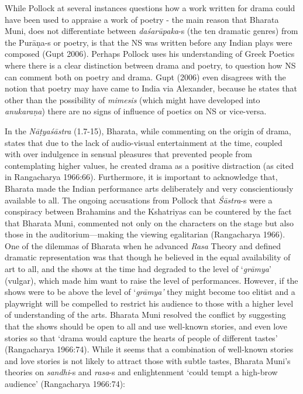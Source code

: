 While Pollock at several instances questions how a work written for drama could have been used to appraise a work of poetry - the main reason that Bharata Muni, does not differentiate between \hbox{\textsl{daśarūpaka}-s} (the ten dramatic genres) from the Purāṇa-s or poetry, is that the NS was written before any Indian plays were composed (Gupt 2006). Perhaps Pollock uses his understanding of Greek Poetics where there is a clear distinction between drama and poetry, to question how NS can comment both on poetry and drama. Gupt (2006) even disagrees with the notion that poetry may have came to India via Alexander, because he states that other than the possibility of \textsl{mimesis} (which might have developed into \textsl{anukaraṇa}) there are no signs of influence of poetics on NS or vice-versa. 


In the \textsl{Nāṭyaśāstra} (1.7-15), Bharata, while commenting on the origin of drama, states that due to the lack of audio-visual entertainment at the time, coupled with over indulgence in sensual pleasures that prevented people from contemplating higher values, he created drama as a positive distraction (as cited in Rangacharya 1966:66). Furthermore, it is important to acknowledge that, Bharata made the Indian performance arts deliberately and very conscientiously available to all. The ongoing accusations from Pollock that \textsl{Śāstra}-s were a conspiracy between Brahamins and the Kshatriyas can be countered by the fact that Bharata Muni, commented not only on the characters on the stage but also those in the auditorium---making the viewing egalitarian (Rangacharya 1966). One of the dilemmas of Bharata when he advanced \textsl{Rasa} Theory and defined dramatic representation was that though he believed in the equal availability of art to all, and the shows at the time had degraded to the level of ‘\textsl{grāmya}’ (vulgar), which made him want to raise the level of performances. However, if the shows were to be above the level of ‘\textsl{grāmya’} they might become too elitist and a playwright will be compelled to restrict his audience to those with a higher level of understanding of the arts. Bharata Muni resolved the conflict by suggesting that the shows should be open to all and use well-known stories, and even love stories so that ‘drama would capture the hearts of people of different tastes’ (Rangacharya 1966:74). While it seems that a combination of well-known stories and love stories is not likely to attract those with subtle tastes, Bharata Muni’s theories on \hbox{\textsl{sandhi}-s} and \textsl{rasa}-s and enlightenment ‘could tempt a high-brow audience’ (Rangacharya 1966:74):

